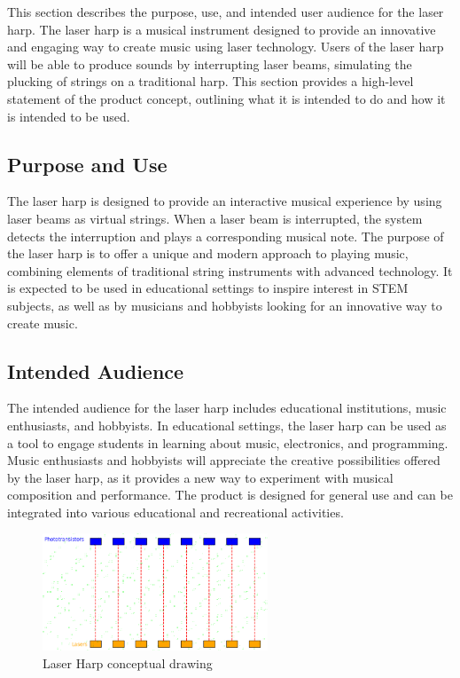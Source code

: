 This section describes the purpose, use, and intended user audience for the laser harp. The laser harp is a musical instrument designed to provide an innovative and engaging way to create music using laser technology. Users of the laser harp will be able to produce sounds by interrupting laser beams, simulating the plucking of strings on a traditional harp. This section provides a high-level statement of the product concept, outlining what it is intended to do and how it is intended to be used.

\subsection{Purpose and Use}
The laser harp is designed to provide an interactive musical experience by using laser beams as virtual strings. When a laser beam is interrupted, the system detects the interruption and plays a corresponding musical note. The purpose of the laser harp is to offer a unique and modern approach to playing music, combining elements of traditional string instruments with advanced technology. It is expected to be used in educational settings to inspire interest in STEM subjects, as well as by musicians and hobbyists looking for an innovative way to create music.

\subsection{Intended Audience}
The intended audience for the laser harp includes educational institutions, music enthusiasts, and hobbyists. In educational settings, the laser harp can be used as a tool to engage students in learning about music, electronics, and programming. Music enthusiasts and hobbyists will appreciate the creative possibilities offered by the laser harp, as it provides a new way to experiment with musical composition and performance. The product is designed for general use and can be integrated into various educational and recreational activities.

\begin{figure}[h!]
	\centering
   	\includegraphics[width=0.60\textwidth]{images/Design}
    \caption{Laser Harp conceptual drawing}
\end{figure}

